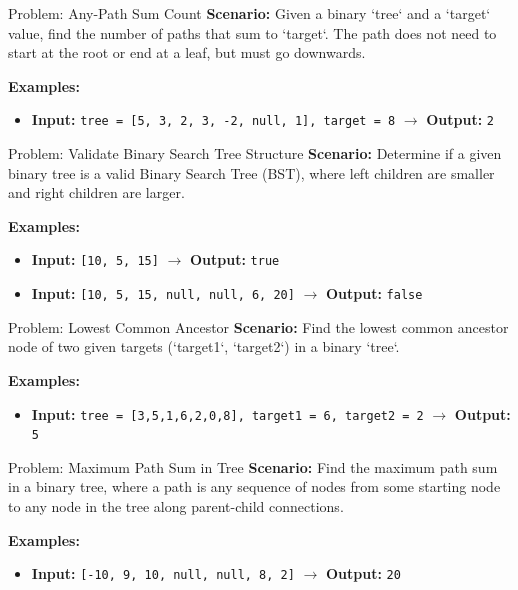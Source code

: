 \begin{frame}[fragile]{Problem: Any-Path Sum Count}
  \textbf{Scenario:}
  Given a binary `tree` and a `target` value, find the number of paths that sum to `target`. The path does not need to start at the root or end at a leaf, but must go downwards.
  
  \vspace{0.3cm}
  \textbf{Examples:}
  \begin{itemize}
    \item \textbf{Input:} \texttt{tree = [5, 3, 2, 3, -2, null, 1], target = 8} $\rightarrow$ \textbf{Output:} \texttt{2}
  \end{itemize}
\end{frame}

\begin{frame}[fragile]{Problem: Validate Binary Search Tree Structure}
  \textbf{Scenario:}
  Determine if a given binary tree is a valid Binary Search Tree (BST), where left children are smaller and right children are larger.
  
  \vspace{0.3cm}
  \textbf{Examples:}
  \begin{itemize}
    \item \textbf{Input:} \texttt{[10, 5, 15]} $\rightarrow$ \textbf{Output:} \texttt{true}
    \item \textbf{Input:} \texttt{[10, 5, 15, null, null, 6, 20]} $\rightarrow$ \textbf{Output:} \texttt{false}
  \end{itemize}
\end{frame}

\begin{frame}[fragile]{Problem: Lowest Common Ancestor}
  \textbf{Scenario:}
  Find the lowest common ancestor node of two given targets (`target1`, `target2`) in a binary `tree`.
  
  \vspace{0.3cm}
  \textbf{Examples:}
  \begin{itemize}
    \item \textbf{Input:} \texttt{tree = [3,5,1,6,2,0,8], target1 = 6, target2 = 2} $\rightarrow$ \textbf{Output:} \texttt{5}
  \end{itemize}
\end{frame}

\begin{frame}[fragile]{Problem: Maximum Path Sum in Tree}
  \textbf{Scenario:}
  Find the maximum path sum in a binary tree, where a path is any sequence of nodes from some starting node to any node in the tree along parent-child connections.
  
  \vspace{0.3cm}
  \textbf{Examples:}
  \begin{itemize}
    \item \textbf{Input:} \texttt{[-10, 9, 10, null, null, 8, 2]} $\rightarrow$ \textbf{Output:} \texttt{20}
  \end{itemize}
\end{frame}

